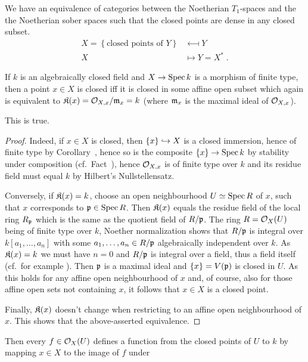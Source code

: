 \documentclass[a4paper,parskip=half,numbers=enddot, DIV=12]{scrreprt}
\begin{document}
\begin{fact}
    We have an equivalence of categories between the Noetherian $T_1$-spaces and the the Noetherian sober spaces such that the closed points are dense in any closed subset. 
    \begin{align*}
        X =\left\{\text{closed points of } Y\right\} &\longmapsfrom Y\\
        X&\longmapsto Y= X^*\;.
    \end{align*}
\end{fact}
If $k$ is an algebraically closed field and $X\morphism \Spec k$ is a morphism of finite type, then a point $x\in X$ is closed iff it is closed in some affine open subset which again is equivalent to $\mathfrak{K}(x)=\mathcal{O}_{X,x}/\mathfrak{m}_x = k$ (where $\mathfrak{m}_x$ is the maximal ideal of $\mathcal{O}_{X,x}$). 
\begin{claim*}
	This is true.
\end{claim*}
\begin{proof}
	Indeed, if $x\in X$ is closed, then $\{x\}\monomorphism X$ is a closed immersion, hence of finite type by Corollary~, hence so is the composite $\{x\}\morphism\Spec k$ by stability under composition (cf.\ Fact~), hence $\mathcal{O}_{X,x}$ is of finite type over $k$ and its residue field must equal $k$ by Hilbert's Nullstellensatz.
	
	Conversely, if $\mathfrak{K}(x)=k$, choose an open neighbourhood $U\simeq \operatorname{Spec} R$ of $x$, such that $x$ corresponds to $\mathfrak{p}\in\operatorname{Spec} R$. Then $\mathfrak{K}(x)$ equals the residue field of the local ring $R_{\mathfrak{p}}$ which is the same as the quotient field of $R/\mathfrak{p}$. The ring $R=\mathcal{O}_X(U)$ being of finite type over $k$, Noether normalization  shows that $R/\mathfrak{p}$ is integral over $k[a_1,\ldots,a_n]$ with some $a_1,\ldots,a_n\in R/\mathfrak{p}$ algebraically independent over $k$. As $\mathfrak{K}(x)=k$ we must have $n=0$ and $R/\mathfrak{p}$ is integral over a field, thus a field itself (cf.\ for example \cite[Proposition~1.5.1]{alg1}). Then $\mathfrak{p}$ is a maximal ideal and $\{x\}=V(\mathfrak{p})$ is closed in $U$. As this holds for any affine open neighbourhood of $x$ and, of course, also for those affine open sets not containing $x$, it follows that $x\in X$ is a closed point.
	
	Finally, $\mathfrak{K}(x)$ doesn't change when restricting to an affine open neighbourhood of $x$. This shows that the above-asserted equivalence.
\end{proof}
Then every $f\in \mathcal{O}_X(U)$ defines a function from the closed points of $U$ to $k$ by mapping $x\in X$ to the image of $f$ under
\end{document}
